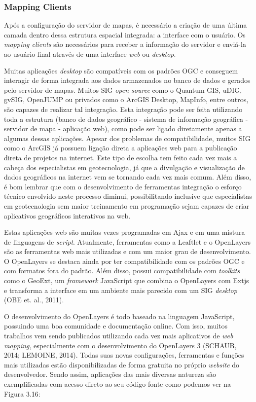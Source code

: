 		\subsubsection{Mapping Clients}
		
		Após a configuração do servidor de mapas, é necessário a criação de uma última camada dentro dessa estrutura espacial integrada: a interface com o usuário. Os \textit{mapping clients} são necessários para receber a informação do servidor e enviá-la ao usuário final através de uma interface \textit{web} ou \textit{desktop}.
		
		Muitas aplicações \textit{desktop} são compatíveis com os padrões OGC e conseguem interagir de forma integrada aos dados armazenados no banco de dados e gerados pelo servidor de mapas. Muitos SIG \textit{open source} como o Quantum GIS, uDIG, gvSIG, OpenJUMP ou privados como o ArcGIS Desktop, MapInfo, entre outros, são capazes de realizar tal integração. Esta integração pode ser feita utilizando toda a estrutura (banco de dados geográfico - sistema de informação geográfica - servidor de mapa - aplicação web), como pode ser ligado diretamente apenas a algumas dessas aplicações. Apesar dos problemas de compatibilidade, muitos SIG como o ArcGIS já possuem ligação direta a aplicações web para a publicação direta de projetos na internet. Este tipo de escolha tem feito cada vez mais a cabeça dos especialistas em geotecnologia, já que a divulgação e visualização de dados geográficos na internet vem se tornando cada vez mais comum. Além disso, é bom lembrar que com o desenvolvimento de ferramentas integração o esforço técnico envolvido neste processo diminui, possibilitando inclusive que especialistas em geotecnologia sem maior treinamento em programação sejam capazes de criar aplicativos geográficos interativos na web.
		
		Estas aplicações web são muitas vezes programadas em Ajax e em uma mistura de linguagens de \textit{script}. Atualmente, ferramentas como a Leaftlet e o OpenLayers são as ferramentas web mais utilizadas e com um maior grau de desenvolvimento. O OpenLayers se destaca ainda por ter compatibilidade com os padrões OGC e com formatos fora do padrão. Além disso, possui compatibilidade com \textit{toolkits} como o GeoExt, um \textit{framework} JavaScript que combina o OpenLayers com Extjs  e transforma a interface em um ambiente mais parecido com um SIG \textit{desktop} (OBE et. al., 2011).
		
		O desenvolvimento do OpenLayers é todo baseado na linguagem JavaScript, possuindo uma boa comunidade e documentação online. Com isso, muitos trabalhos vem sendo publicados utilizando cada vez mais aplicativos de \textit{web mapping}, especialmente com o desenvolvimento do OpenLayers 3 (SCHAUB, 2014; LEMOINE, 2014). Todas suas novas configurações, ferramentas e funções mais utilizadas estão disponibilizadas de forma gratuita no próprio \textit{website} do desenvolvedor. Sendo assim, aplicações das mais diversas natureza são exemplificadas com acesso direto ao seu código-fonte como podemos ver na Figura 3.16: 
		
